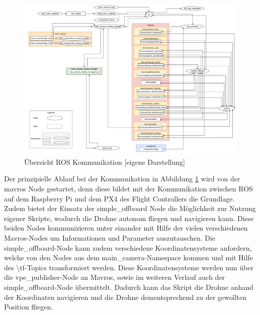     \begin{landscape}
        \begin{figure}
            \includegraphics[width=\paperwidth,keepaspectratio]{images/graph_ros.pdf}
            \caption[Übersicht ROS Kommunikation]{\label{img ros_communication} Übersicht ROS Kommunikation [eigene Darstellung]}
        \end{figure}
    \end{landscape}


Der prinzipielle Ablauf bei der Kommunikation in Abbildung \ref{img ros_communication} wird von der mavros Node gestartet, denn diese bildet mit der Kommunikation zwischen ROS auf dem Raspberry Pi und dem PX4 des Flight Controllers die Grundlage. Zudem bietet der Einsatz der simple\_offboard Node die Möglichkeit zur Nutzung eigener Skripte, wodurch die Drohne autonom fliegen und navigieren kann. Diese beiden Nodes kommunizieren unter einander mit Hilfe der vielen verschiedenen Mavros-Nodes um Informationen und Parameter auszutauschen. Die simple\_offboard-Node kann zudem verschiedene Koordinatensysteme anfordern, welche von den Nodes aus dem main\_camera-Namespace kommen und mit Hilfe des \textbackslash tf-Topics transformiert werden. Diese Koordinatensysteme werden nun über die vpe\_publisher-Node an Mavros, sowie im weiteren Verlauf auch der simple\_offboard-Node übermittelt. Dadurch kann das Skript die Drohne anhand der Koordinaten navigieren und die Drohne dementsprechend zu der gewollten Position fliegen.


